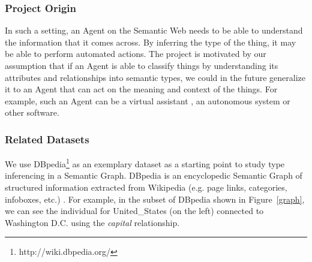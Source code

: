 \documentclass[runningheads,a4paper]{IEEEtran}
\begin{document}
\subsubsection{Project Origin}
In such a setting, an Agent on the Semantic Web needs to be able to understand the information that it comes across. By inferring the type of the thing, it may be able to perform automated actions. The project is motivated by 
our assumption that if an Agent is able to classify things by understanding
its attributes and relationships into semantic types, we could in the future 
generalize it to an Agent that can act on the meaning and context of the things. For example, such an Agent can be a virtual assistant  \cite{tang2017emergence} \cite{schmeil2007mara}, an autonomous system \cite{cordts2015cityscapes} or other software\cite{backstrom2011supervised}. 



\subsubsection{Related Datasets}
\label{dataset}
We use DBpedia\footnote{http://wiki.dbpedia.org/}  as an exemplary dataset 
as a starting point to study type inferencing in a Semantic Graph. 
DBpedia is an encyclopedic Semantic Graph of structured information extracted from Wikipedia (e.g. page links, categories, infoboxes, etc.) \cite{lehmann2015dbpedia} \cite{dbpedia-swj}. For example, in the subset of DBpedia shown in Figure~\ref{graph}, we can see the individual for United\_States (on the left) connected to Washington D.C. using the \textit{capital} relationship. 
\end{document}
